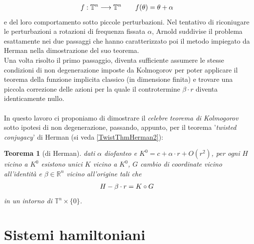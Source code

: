 \documentclass[twoside, 11pt]{amsbook}
\newcommand{\0}{{(0)}}
\newcommand{\3}{{(3)}}
\theoremstyle{colonplain}
\newtheorem{thm}{Teorema}[chapter]
\theoremstyle{colondefinition}
\theoremstyle{colonremark}
\numberwithin{equation}{chapter}
\begin{document}
\begin{align}
    f : \mathbb{T}^n \longrightarrow \mathbb{T}^n \qquad f(\theta) = \theta + \alpha \notag
\end{align}
e del loro comportamento sotto piccole perturbazioni. Nel tentativo di riconiugare le perturbazioni a rotazioni di frequenza fissata $\alpha$, Arnold suddivise il problema esattamente nei due passaggi che hanno caratterizzato poi il metodo impiegato da Herman nella dimostrazione del suo teorema. \\
Una volta risolto il primo passaggio, diventa sufficiente assumere le stesse condizioni di non degenerazione imposte da Kolmogorov per poter applicare il teorema della funzione implicita classico (in dimensione finita) e trovare una piccola correzione delle azioni per la quale il controtermine $\beta \cdot r$ diventa identicamente nullo. \\ \\
In questo lavoro ci proponiamo di dimostrare il \textit{celebre teorema di Kolmogorov} sotto ipotesi di non degenerazione, passando, appunto, per il teorema '\textit{twisted conjugacy}' di Herman (si veda \ref{TwistThmHerman2}):
\begin{thm}[di Herman]
    dati $\alpha$ diofanteo e $K^0 = c + \alpha \cdot r + O(r^2)$, per ogni $H$ vicino a $K^0$ esistono unici $K$ vicino a $K^0$, $G$ cambio di coordinate vicino all'identità e $\beta \in \mathbb{R}^n$ vicino all'origine tali che
\begin{align}
    H - \beta \cdot r = K \circ G \notag
\end{align}
in un intorno di $\mathbb{T}^n \times \{0\}$.
\end{thm}



\chapter{Sistemi hamiltoniani}
\end{document}
